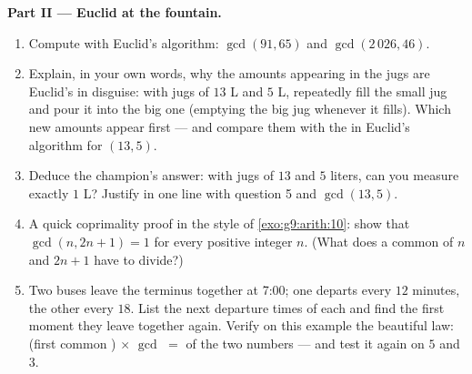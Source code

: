 \begin{problem}
\medskip
\noindent\textbf{Part II --- Euclid at the fountain.}
\begin{enumerate}[resume]
  \item Compute with Euclid's algorithm: $\gcd(91, 65)$ and
        $\gcd(2\,026, 46)$.
  \item Explain, in your own words, why the amounts appearing in
        the jugs are Euclid's  in disguise: with jugs
        of $13$ L and $5$ L, repeatedly fill the small jug and
        pour it into the big one (emptying the big jug whenever
        it fills). Which new amounts appear first --- and
        compare them with the  in Euclid's algorithm
        for $(13, 5)$.
  \item Deduce the champion's answer: with jugs of $13$ and $5$
        liters, can you measure exactly $1$ L? Justify in one
        line with question 5 and $\gcd(13, 5)$.
  \item A quick coprimality proof in the style of
        \cref{exo:g9:arith:10}: show that $\gcd(n, 2n + 1) = 1$
        for every positive integer $n$. (What does a common
         of $n$ and $2n + 1$ have to divide?)
  \item Two buses leave the terminus together at 7:00; one
        departs every $12$ minutes, the other every $18$. List
        the next departure times of each and find the first
        moment they leave together again. Verify on this example
        the beautiful law: (first common ) $\times$
        $\gcd$ $=$  of the two numbers --- and test it
        again on $5$ and $3$.
\end{enumerate}


\end{problem}
